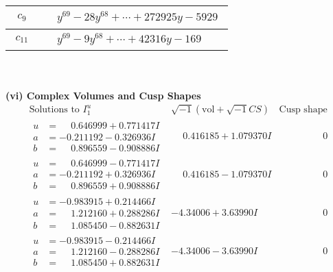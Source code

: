 \documentclass[1p]{elsarticle_modified}
\theoremstyle{definition}
\newcommand{\I}{\sqrt{-1}}
\begin{document}
\begin{tabular}{m{50pt}|m{274pt}}
\hline $$\begin{aligned}c_{9}\end{aligned}$$&$\begin{aligned}
&y^{69}-28 y^{68}+\cdots+272925 y-5929
\end{aligned}$\\
\hline $$\begin{aligned}c_{11}\end{aligned}$$&$\begin{aligned}
&y^{69}-9 y^{68}+\cdots+42316 y-169
\end{aligned}$\\
\hline
\end{tabular}\\~\\
\newpage\flushleft \textbf{(vi) Complex Volumes and Cusp Shapes}
$$\begin{array}{c|c|c}  
\text{Solutions to }I^u_{1}& \I (\text{vol} + \sqrt{-1}CS) & \text{Cusp shape}\\
 \hline 
\begin{aligned}
u &= \phantom{-}0.646999 + 0.771417 I \\
a &= -0.211192 - 0.326936 I \\
b &= \phantom{-}0.896559 - 0.908886 I\end{aligned}
 & \phantom{-}0.416185 + 1.079370 I & \phantom{-0.000000 } 0 \\ \hline\begin{aligned}
u &= \phantom{-}0.646999 - 0.771417 I \\
a &= -0.211192 + 0.326936 I \\
b &= \phantom{-}0.896559 + 0.908886 I\end{aligned}
 & \phantom{-}0.416185 - 1.079370 I & \phantom{-0.000000 } 0 \\ \hline\begin{aligned}
u &= -0.983915 + 0.214466 I \\
a &= \phantom{-}1.212160 + 0.288286 I \\
b &= \phantom{-}1.085450 - 0.882631 I\end{aligned}
 & -4.34006 + 3.63990 I & \phantom{-0.000000 } 0 \\ \hline\begin{aligned}
u &= -0.983915 - 0.214466 I \\
a &= \phantom{-}1.212160 - 0.288286 I \\
b &= \phantom{-}1.085450 + 0.882631 I\end{aligned}
 & -4.34006 - 3.63990 I & \phantom{-0.000000 } 0 \\ \hline\begin{aligned}

\end{aligned}
\end{array}$$
\end{document}
